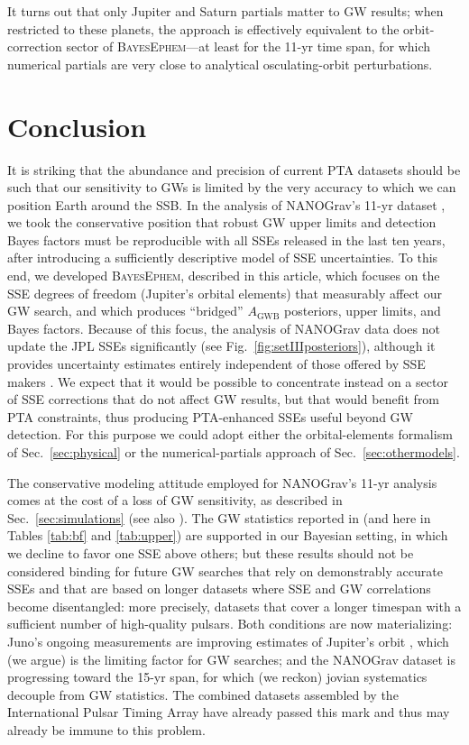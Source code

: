 \documentclass{aastex63}
\begin{document}
\begin{itemize}
    It turns out that only Jupiter and Saturn partials matter to GW results; when restricted to these planets, the approach is effectively equivalent to the orbit-correction sector of \textsc{BayesEphem}---at least for the 11-yr time span, for which numerical partials are very close to analytical osculating-orbit perturbations.
\end{itemize}

\section{Conclusion}
\label{sec:conclusion}

It is striking that the abundance and precision of current PTA datasets should be such that our sensitivity to GWs is limited by the very accuracy to which we can position Earth around the SSB.
In the analysis of NANOGrav's 11-yr dataset \citep{2018ApJ...859...47A}, we took the conservative position that robust GW upper limits and detection Bayes factors must be reproducible with all SSEs released in the last ten years, after introducing a sufficiently descriptive model of SSE uncertainties.
To this end, we developed \textsc{BayesEphem}, described in this article, which focuses on the SSE degrees of freedom (Jupiter's orbital elements) that measurably affect our GW search, and which produces ``bridged'' $A_\mathrm{GWB}$ posteriors, upper limits, and Bayes factors. Because of this focus, the analysis of NANOGrav data does not update the JPL SSEs significantly (see Fig.\ \ref{fig:setIIIposteriors}), although it provides uncertainty estimates entirely independent of those offered by SSE makers \citep{de434,de438}. We expect that it would be possible to concentrate instead on a sector of SSE corrections that do not affect GW results, but that would benefit from PTA constraints, thus producing PTA-enhanced SSEs useful beyond GW detection. For this purpose we could adopt either the orbital-elements formalism of Sec.\ \ref{sec:physical} or the numerical-partials approach of Sec.\ \ref{sec:othermodels}.

The conservative modeling attitude employed for NANOGrav's 11-yr analysis comes at the cost of a loss of GW sensitivity, as described in Sec.\ \ref{sec:simulations} (see also \citealt{2019ApJ...876...55R}). The GW statistics reported in \cite{2018ApJ...859...47A} (and here in Tables \ref{tab:bf} and \ref{tab:upper}) are supported in our Bayesian setting, in which we decline to favor one SSE above others; but these results should not be considered binding for future GW searches that rely on demonstrably accurate SSEs and that are based on longer datasets where SSE and GW correlations become disentangled:
more precisely, datasets that cover a longer timespan with a sufficient number of high-quality pulsars.
Both conditions are now materializing: Juno's ongoing measurements are improving estimates of Jupiter's orbit \citep{de438}, which (we argue) is the limiting factor for GW searches; and the NANOGrav dataset is progressing toward the 15-yr span, for which (we reckon) jovian systematics decouple from GW statistics.
The combined datasets assembled by the International Pulsar Timing Array \citep{2019MNRAS.490.4666P} have already passed this mark and thus may already be immune to this problem.
\end{document}
